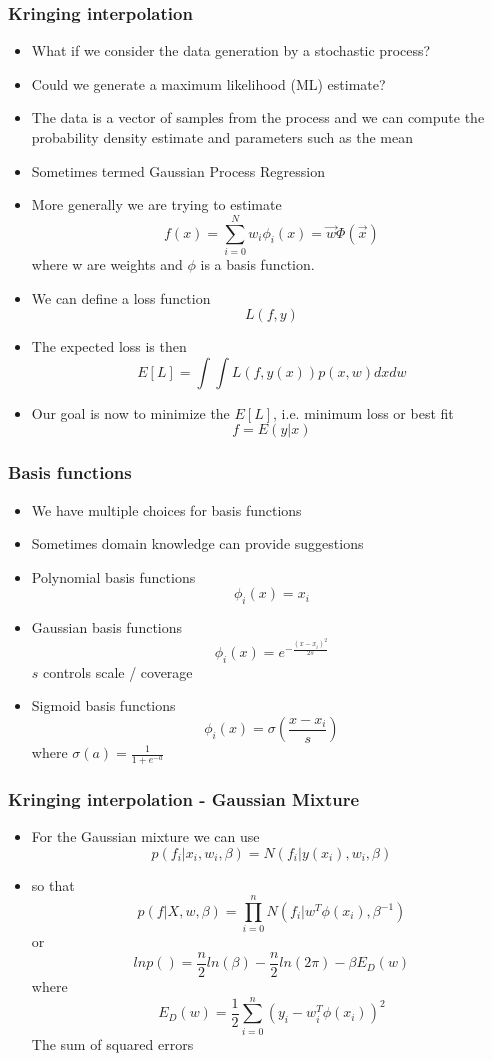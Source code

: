 \documentclass[10pt]{beamer}
\begin{document}
\begin{frame}
  \frametitle{Kringing interpolation}
  \begin{itemize}
  \item What if we consider the data generation by a stochastic process? 
  \item Could we generate a maximum likelihood (ML) estimate?
  \item The data is a vector of samples from the process and we can
    compute the probability density estimate and parameters such as
    the mean
  \item Sometimes termed Gaussian Process Regression
  \item More generally we are trying to estimate
    \[
      f(x) = \sum_{i=0}^N w_i \phi_i(x) = \vec{w} \Phi(\vec{x})
    \]
    where w are weights and $\phi$ is a basis function.
    \pause
  \item We can define a loss function
    \[ L(f, y) \]
  \item The expected loss is then
    \[ E[L] = \int \int L( f, y(x) ) p(x,w) dx dw \]
  \item Our goal is now to minimize the $E[L]$, i.e. minimum loss or best fit
    \[ f = E(y|x) \]
  \end{itemize}
\end{frame}

\begin{frame}
  \frametitle{Basis functions}
  \begin{itemize}
  \item We have multiple choices for basis functions
  \item Sometimes domain knowledge can provide suggestions
  \item Polynomial basis functions
    \[ \phi_i(x) = x_i \]
  \item Gaussian basis functions
    \[
      \phi_i(x) = e^{-\frac{(x-x_i)^2}{2s}}
    \]
    $s$ controls scale / coverage
  \item Sigmoid basis functions
    \[
      \phi_i(x) = \sigma \left( \frac{ x-x_i }{s} \right)
    \] where
    $\sigma(a) = \frac{1}{1+e^{-a}}$
  \end{itemize}
\end{frame}

\begin{frame}
  \frametitle{Kringing interpolation - Gaussian Mixture}
  \begin{itemize}
  \item For the Gaussian mixture we can use
    \[ p(f_i | x_i, w_i, \beta) = N( f_i | y(x_i), w_i, \beta)  \]
  \item so that
    \[
      p( f | X, w, \beta) = \prod_{i=0}^n N(f_i | w^T \phi(x_i), \beta^{-1})
    \] or
    \[
      ln p() = \frac{n}{2} ln(\beta)  - \frac{n}{2} ln(2\pi) - \beta E_D(w)
    \] where
    \[ E_D(w) = \frac{1}{2} \sum_{i=0}^n (y_i - w^T_i \phi(x_i))^2 \] The sum of squared errors
  \end{itemize}
\end{frame}
\end{document}
